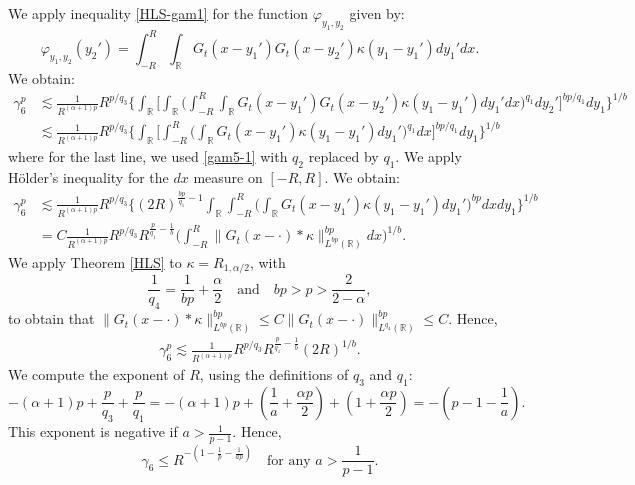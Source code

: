 \documentclass[12pt]{article}
\def\bR{\mathbb{R}}
\newcommand{\les}{\lesssim}
\def\k{\kappa}
\begin{document}
\begin{itemize}
We apply inequality \eqref{HLS-gam1} for the function $\varphi_{y_1,y_2}$ given by:
\[
\varphi_{y_1,y_2}(y_2')=\int_{-R}^R\int_{\bR}G_t(x-y_1')G_t(x-y_2') \k(y_1-y_1')  dy_1'dx.
\] 
We obtain:
\begin{align*}
\gamma_6^p & \les \frac{1}{R^{(\alpha+1)p}} R^{p/q_3} \Bigg\{\int_{\bR} \Bigg[\int_{\bR} \Big(\int_{-R}^R\int_{\bR}G_t(x-y_1')G_t(x-y_2') \k(y_1-y_1')  dy_1'dx\Big)^{q_1} dy_2'\Bigg]^{bp/q_1} dy_1 \Bigg\}^{1/b} \\
& \les \frac{1}{R^{(\alpha+1)p}} R^{p/q_3} \Bigg\{\int_{\bR} \Bigg[ \int_{-R}^R \Big( \int_{\bR} G_t(x-y_1') \k(y_1-y_1') dy_1' \Big)^{q_1} dx\Bigg]^{bp/q_1} dy_1 \Bigg\}^{1/b} 
\end{align*}
where for the last line, we used \eqref{gam5-1} with $q_2$ replaced by $q_1$. We apply H\"older's inequality for the $dx$ measure on $[-R,R]$. We obtain:
\begin{align*}
\gamma_6^p & \les \frac{1}{R^{(\alpha+1)p}} R^{p/q_3} \Bigg\{ (2R)^{\frac{bp}{q_1}-1} \int_{\bR}\int_{-R}^R 
\Big( \int_{\bR}  G_t(x-y_1') \k(y_1-y_1') dy_1' \Big)^{bp} dx dy_1 \Bigg\}^{1/b}\\
&=C \frac{1}{R^{(\alpha+1)p}} R^{p/q_3} R^{\frac{p}{q_1}-\frac{1}{b}}
\Bigg( \int_{-R}^R  \|G_{t}(x-\cdot)*\k \|_{L^{bp}(\bR)}^{bp} dx \Bigg)^{1/b}.
\end{align*}
We apply Theorem \eqref{HLS} to $\k=R_{1,\alpha/2}$, with
\begin{equation}
\frac{1}{q_4}=\frac{1}{bp}+\frac{\alpha}{2} \quad \mbox{and} \quad bp>p>\frac{2}{2-\alpha},
\end{equation}
to obtain that $\|G_{t}(x-\cdot)*\k \|_{L^{bp}(\bR)}^{bp} \leq C \|G_t(x-\cdot)\|_{L^{q_4}(\bR)}^{bp} \leq C$. Hence,
\begin{align*}
\gamma_6^p \les  \frac{1}{R^{(\alpha+1)p}} R^{p/q_3} R^{\frac{p}{q_1}-\frac{1}{b}} (2R)^{1/b}.
\end{align*}
We compute the exponent of $R$, using the definitions of $q_3$ and $q_1$:
\[
-(\alpha+1)p+\frac{p}{q_3} +\frac{p}{q_1}=-(\alpha+1)p+\left(\frac{1}{a}+\frac{\alpha p}{2}\right)+\left(1+\frac{\alpha p}{2} \right)=-\left(p-1-\frac{1}{a}\right).
\]
This exponent is negative if $a>\frac{1}{p-1}$.
Hence,
\[
\gamma_6 \leq R^{-(1-\frac{1}{p}-\frac{1}{ap})} \quad \mbox{for any $a>\frac{1}{p-1}$}.
\]



\end{itemize}
\end{document}
